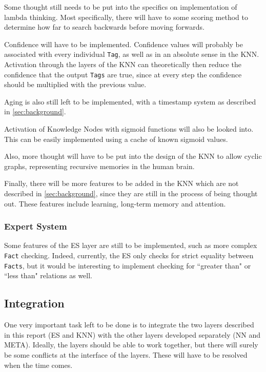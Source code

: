 \documentclass[titlepage,11pt]{article}
\newcommand{\code}[1]{\texttt{#1}}
\begin{document}
Some thought still needs to be put into the specifics on implementation of lambda thinking. Most specifically, there will have to some scoring method to determine how far to search backwards before moving forwards.

Confidence will have to be implemented. Confidence values will probably be associated with every individual \code{Tag}, as well as in an absolute sense in the KNN. Activation through the layers of the KNN can theoretically then reduce the confidence that the output \code{Tags} are true, since at every step the confidence should be multiplied with the previous value.

Aging is also still left to be implemented, with a timestamp system as described in \autoref{sec:background}.

Activation of Knowledge Nodes with sigmoid functions will also be looked into. This can be easily implemented using a cache of known sigmoid values.

Also, more thought will have to be put into the design of the KNN to allow cyclic graphs, representing recursive memories in the human brain.

Finally, there will be more features to be added in the KNN which are not described in \autoref{sec:background}, since they are still in the process of being thought out. These features include learning, long-term memory and attention.

\subsubsection{Expert System}

Some features of the ES layer are still to be implemented, such as more complex \code{Fact} checking. Indeed, currently, the ES only checks for strict equality between \code{Facts}, but it would be interesting to implement checking for ``greater than" or ``less than" relations as well.

\subsection{Integration}

One very important task left to be done is to integrate the two layers described in this report (ES and KNN) with the other layers developed separately (NN and META). Ideally, the layers should be able to work together, but there will surely be some conflicts at the interface of the layers. These will have to be resolved when the time comes.
\end{document}
